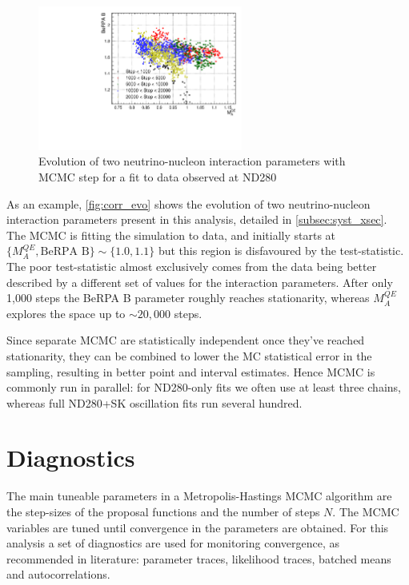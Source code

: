\begin{figure}[h]
	\includegraphics[width=0.6\textwidth, trim={0mm 0mm 0mm 0mm}, clip,page=1]{figures/mcmc/corr_maqe_berpab}
	\caption{Evolution of two neutrino-nucleon interaction parameters with MCMC step for a fit to data observed at ND280}
	\label{fig:corr_evo}
\end{figure}

As an example, \autoref{fig:corr_evo} shows the evolution of two neutrino-nucleon interaction parameters present in this analysis, detailed in \autoref{subsec:syst_xsec}. The MCMC is fitting the simulation to data, and initially starts at $\{M_A^{QE}, \text{BeRPA B}\} \sim \{1.0, 1.1\}$ but this region is disfavoured by the test-statistic. The poor test-statistic almost exclusively comes from the data being better described by a different set of values for the interaction parameters. After only 1,000 steps the BeRPA B parameter roughly reaches stationarity, whereas $M_A^{QE}$ explores the space up to $\sim20,000$ steps.

Since separate MCMC are statistically independent once they've reached stationarity, they can be combined to lower the MC statistical error in the sampling, resulting in better point and interval estimates. Hence MCMC is commonly run in parallel: for ND280-only fits we often use at least three chains, whereas full ND280+SK oscillation fits run several hundred.

\section{Diagnostics}
The main tuneable parameters in a Metropolis-Hastings MCMC algorithm are the step-sizes of the proposal functions and the number of steps $N$. The MCMC variables are tuned until convergence in the parameters are obtained. For this analysis a set of diagnostics are used for monitoring convergence, as recommended in literature\cite{mcmc_handbook}: parameter traces, likelihood traces, batched means and autocorrelations.

